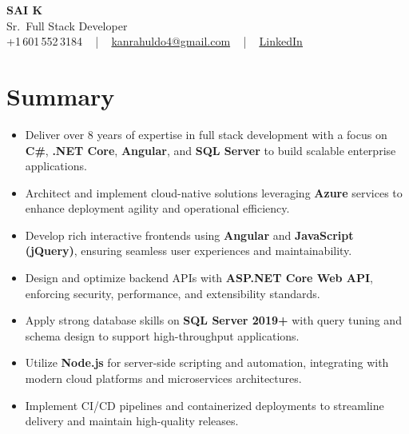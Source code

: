 \documentclass[letterpaper,11pt]{article}
\newcommand{\resumeItem}[1]{
  \item\footnotesize{
    {#1 \vspace{-2pt}}
  }
}
\newcommand{\resumeItemListStart}{\begin{itemize}[leftmargin=*]}
\newcommand{\resumeItemListEnd}{\end{itemize}\vspace{-5pt}}
\begin{document}
\begin{center}
    {\fontsize{14pt}{12pt}\selectfont \textbf{\MakeUppercase{Sai K}}}\\ \vspace{2pt}
    \fontsize{10pt}{12pt}\selectfont Sr.\ Full Stack Developer\\ \vspace{2pt}
    \fontsize{10pt}{12pt}\selectfont +1\,601\,552\,3184 ~ | ~
    \href{mailto:kanrahuldo4@gmail.com}{kanrahuldo4@gmail.com} ~ | ~
    \href{https://www.linkedin.com/in/srrrk/}{\color{blue}\underline{LinkedIn}}
    \vspace{-10pt}
\end{center}

\section{Summary}
\fontsize{9pt}{10pt}\selectfont
\resumeItemListStart
  \resumeItem{Deliver over 8 years of expertise in full stack development with a focus on \textbf{C\#}, \textbf{.NET Core}, \textbf{Angular}, and \textbf{SQL Server} to build scalable enterprise applications.}
  \resumeItem{Architect and implement cloud-native solutions leveraging \textbf{Azure} services to enhance deployment agility and operational efficiency.}
  \resumeItem{Develop rich interactive frontends using \textbf{Angular} and \textbf{JavaScript (jQuery)}, ensuring seamless user experiences and maintainability.}
  \resumeItem{Design and optimize backend APIs with \textbf{ASP.NET Core Web API}, enforcing security, performance, and extensibility standards.}
  \resumeItem{Apply strong database skills on \textbf{SQL Server 2019+} with query tuning and schema design to support high-throughput applications.}
  \resumeItem{Utilize \textbf{Node.js} for server-side scripting and automation, integrating with modern cloud platforms and microservices architectures.}
  \resumeItem{Implement CI/CD pipelines and containerized deployments to streamline delivery and maintain high-quality releases.}
\resumeItemListEnd
\vspace{-6pt}

\end{document}
